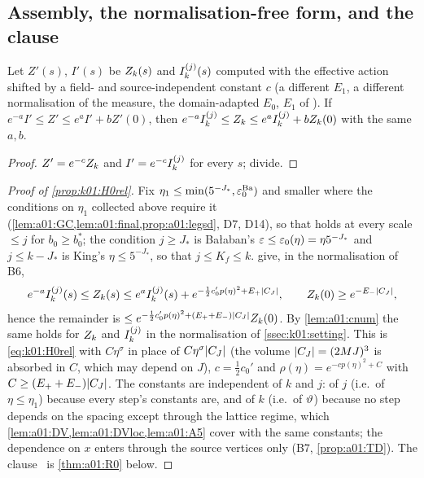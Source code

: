 \subsection{Assembly, the normalisation-free form, and the clause \Rzero}\label{app:a01:assembly}

\begin{lemma}\label{lem:a01:cnum}
Let $Z'(s)$, $I'(s)$ be $Z_{k}(s)$ and $I^{(j)}_{k}(s)$ computed with the effective action shifted by a field- and source-independent constant $c$ (a different $E_1$, a different normalisation of the measure, the domain-adapted $E_0$, $E_1$ of \cite[(3.35)]{K1}). If $e^{-a}I'\le Z'\le e^aI'+bZ'(0)$, then $e^{-a}I^{(j)}_{k}\le Z_{k}\le e^aI^{(j)}_{k}+bZ_{k}(0)$ with the same $a,b$.
\end{lemma}
\begin{proof}
$Z'=e^{-c}Z_{k}$ and $I'=e^{-c}I^{(j)}_{k}$ for every $s$; divide.
\end{proof}

\begin{proof}[Proof of \cref{prop:k01:H0rel}]
Fix $\eta_1\le\min(5^{-J_*},\varepsilon_0^{\mathrm{Ba}})$ and smaller where the conditions on $\eta_1$ collected above require it (\cref{lem:a01:GC,lem:a01:final,prop:a01:legsd}, D7, D14), so that \cite[(3.54)]{Ba1} holds at every scale $\le j$ for $b_0\ge b_0^*$; the condition $j\ge J_*$ is Ba{\l}aban's $\varepsilon\le\varepsilon_0(\eta)=\eta5^{-J_*}$ and $j\le k-J_*$ is King's $\eta\le5^{-J_*}$, so that $j\le K_f\le k$.  give, in the normalisation of B6,
\[
e^{-a}I^{(j)}_{k}(s)\le Z_{k}(s)\le e^{a}I^{(j)}_{k}(s)+e^{-\frac12c_0'p(\eta)^2+E_+|C_J|},\qquad Z_{k}(0)\ge e^{-E_-|C_J|},
\]
hence the remainder is $\le e^{-\frac12c_0'p(\eta)^2+(E_++E_-)|C_J|}Z_{k}(0)$. By \cref{lem:a01:cnum} the same holds for $Z_{k}$ and $I^{(j)}_{k}$ in the normalisation of \cref{ssec:k01:setting}. This is \eqref{eq:k01:H0rel} with $C\eta^\sigma$ in place of $C\eta^\sigma|C_J|$ (the volume $|C_J|=(2MJ)^3$ is absorbed in $C$, which may depend on $J$), $c=\frac12c_0'$ and $\rho(\eta)=e^{-cp(\eta)^2+C}$ with $C\ge(E_++E_-)|C_J|$. The constants are independent of $k$ and $j$: of $j$ (i.e.\ of $\eta\le\eta_1$) because every step's constants are, and of $k$ (i.e.\ of $\vartheta$) because no step depends on the spacing except through the lattice regime, which \cref{lem:a01:DV,lem:a01:DVloc,lem:a01:A5} cover with the same constants; the dependence on $x$ enters through the source vertices only (B7, \cref{prop:a01:TD}). The clause \Rzero\ is \cref{thm:a01:R0} below.
\end{proof}

